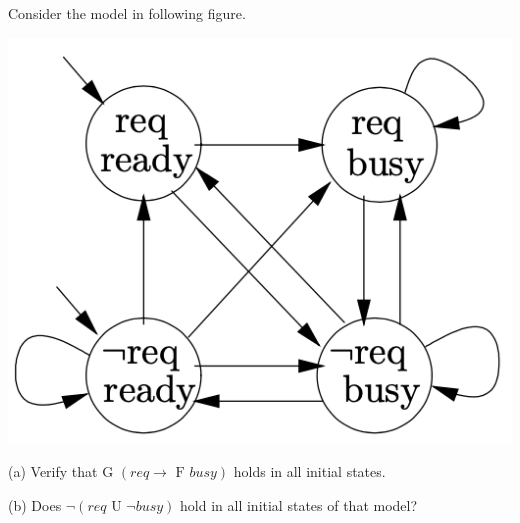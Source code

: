 Consider the model in following figure.
\begin{center}
    \includegraphics[scale=0.5]{Details/p2.png}
\end{center}

(a) Verify that $\textrm{G }(req \rightarrow \textrm{ F } busy)$ holds in all initial states.

(b) Does $\neg(req \textrm{ U } \neg busy)$ hold in all initial states of that model?
